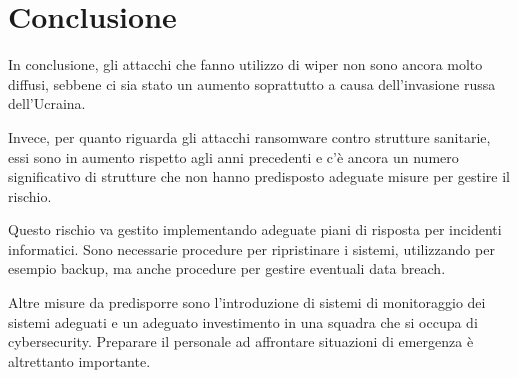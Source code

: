 \documentclass[12pt]{article}
\begin{document}
\newpage

\section{Conclusione}

In conclusione, gli attacchi che fanno utilizzo di wiper non sono ancora molto diffusi, sebbene ci sia stato un aumento soprattutto a causa dell'invasione russa dell'Ucraina.

Invece, per quanto riguarda gli attacchi ransomware contro strutture sanitarie, essi sono in aumento rispetto agli anni precedenti e c'è ancora un numero significativo di strutture che non hanno predisposto adeguate misure per gestire il rischio.

Questo rischio va gestito implementando adeguate piani di risposta per incidenti informatici. Sono necessarie procedure per ripristinare i sistemi, utilizzando per esempio backup, ma anche procedure per gestire eventuali data breach.

Altre misure da predisporre sono l'introduzione di sistemi di monitoraggio dei sistemi adeguati e un adeguato investimento in una squadra che si occupa di cybersecurity. Preparare il personale ad affrontare situazioni di emergenza è altrettanto importante.
\newpage
\printbibliography
\end{document}
